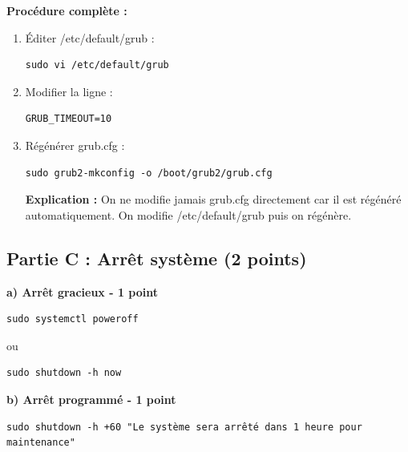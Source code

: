\documentclass[12pt,a4paper]{article}
\begin{document}
\begin{answerbox}
\textbf{Procédure complète :}

\begin{enumerate}
    \item Éditer /etc/default/grub :
    \begin{lstlisting}
sudo vi /etc/default/grub
    \end{lstlisting}
    
    \item Modifier la ligne :
    \begin{verbatim}
GRUB_TIMEOUT=10
    \end{verbatim}
    
    \item Régénérer grub.cfg :
    \begin{lstlisting}
sudo grub2-mkconfig -o /boot/grub2/grub.cfg
    \end{lstlisting}
    
    \textbf{Explication :} On ne modifie jamais grub.cfg directement car il est régénéré automatiquement. On modifie /etc/default/grub puis on régénère.
\end{enumerate}
\end{answerbox}

\subsection*{Partie C : Arrêt système (2 points)}

\begin{answerbox}
\textbf{a) Arrêt gracieux - 1 point}
\begin{lstlisting}
sudo systemctl poweroff
\end{lstlisting}

ou

\begin{lstlisting}
sudo shutdown -h now
\end{lstlisting}

\textbf{b) Arrêt programmé - 1 point}
\begin{lstlisting}
sudo shutdown -h +60 "Le système sera arrêté dans 1 heure pour maintenance"
\end{lstlisting}
\end{answerbox}

\newpage

\end{document}
